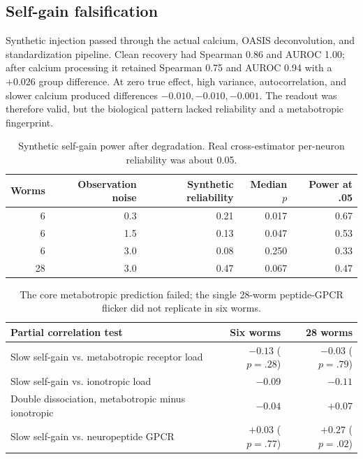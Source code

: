 \documentclass[10pt]{article}
\begin{document}
\subsection{Self-gain falsification}

Synthetic injection passed through the actual calcium, OASIS deconvolution, and standardization pipeline. Clean recovery had Spearman 0.86 and AUROC 1.00; after calcium processing it retained Spearman 0.75 and AUROC 0.94 with a $+0.026$ group difference. At zero true effect, high variance, autocorrelation, and slower calcium produced differences $-0.010,-0.010,-0.001$. The readout was therefore valid, but the biological pattern lacked reliability and a metabotropic fingerprint.

\begin{table}[H]
\centering\small
\begin{tabular}{rrrrr}
\toprule Worms & Observation noise & Synthetic reliability & Median $p$ & Power at .05 \\
\midrule
6 & 0.3 & 0.21 & 0.017 & 0.67 \\
6 & 1.5 & 0.13 & 0.047 & 0.53 \\
6 & 3.0 & 0.08 & 0.250 & 0.33 \\
28 & 3.0 & 0.47 & 0.067 & 0.47 \\
\bottomrule
\end{tabular}
\caption{Synthetic self-gain power after degradation. Real cross-estimator per-neuron reliability was about 0.05.}
\end{table}

\begin{table}[H]
\centering\small
\begin{tabularx}{\linewidth}{Y rr}
\toprule Partial correlation test & Six worms & 28 worms \\
\midrule
Slow self-gain vs. metabotropic receptor load & $-0.13$ ($p=.28$) & $-0.03$ ($p=.79$) \\
Slow self-gain vs. ionotropic load & $-0.09$ & $-0.11$ \\
Double dissociation, metabotropic minus ionotropic & $-0.04$ & $+0.07$ \\
Slow self-gain vs. neuropeptide GPCR & $+0.03$ ($p=.77$) & $+0.27$ ($p=.02$) \\
\bottomrule
\end{tabularx}
\caption{The core metabotropic prediction failed; the single 28-worm peptide-GPCR flicker did not replicate in six worms.}
\end{table}
\end{document}
